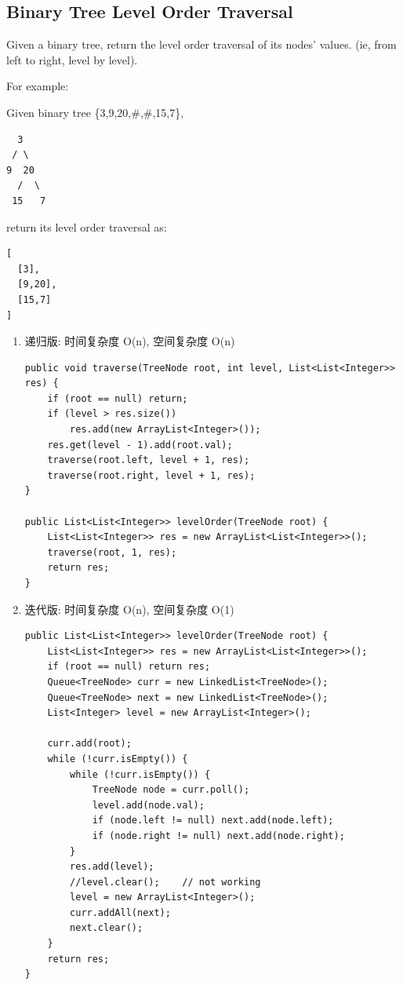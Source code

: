 \documentclass[12pt]{book}
\begin{document}
\subsection{Binary Tree Level Order Traversal}
\label{sec-4-2-4}
Given a binary tree, return the level order traversal of its nodes' values. (ie, from left to right, level by level).

For example:

Given binary tree \{3,9,20,\#,\#,15,7\},
\lstset{language=java,label= ,caption= ,numbers=none}
\begin{lstlisting}
  3
 / \
9  20
  /  \
 15   7
\end{lstlisting}
return its level order traversal as:
\lstset{language=java,label= ,caption= ,numbers=none}
\begin{lstlisting}
[
  [3],
  [9,20],
  [15,7]
]
\end{lstlisting}

\begin{enumerate}
\item 递归版: 时间复杂度 O(n), 空间复杂度 O(n)
\label{sec-4-2-4-1}

\lstset{language=java,label= ,caption= ,numbers=none}
\begin{lstlisting}
public void traverse(TreeNode root, int level, List<List<Integer>> res) {
    if (root == null) return;
    if (level > res.size())
        res.add(new ArrayList<Integer>());
    res.get(level - 1).add(root.val);
    traverse(root.left, level + 1, res);
    traverse(root.right, level + 1, res);
}

public List<List<Integer>> levelOrder(TreeNode root) {
    List<List<Integer>> res = new ArrayList<List<Integer>>();
    traverse(root, 1, res);
    return res;
}
\end{lstlisting}

\item 迭代版: 时间复杂度 O(n), 空间复杂度 O(1)
\label{sec-4-2-4-2}

\lstset{language=java,label= ,caption= ,numbers=none}
\begin{lstlisting}
public List<List<Integer>> levelOrder(TreeNode root) {
    List<List<Integer>> res = new ArrayList<List<Integer>>();
    if (root == null) return res;
    Queue<TreeNode> curr = new LinkedList<TreeNode>();
    Queue<TreeNode> next = new LinkedList<TreeNode>();
    List<Integer> level = new ArrayList<Integer>();

    curr.add(root);
    while (!curr.isEmpty()) {
        while (!curr.isEmpty()) {
            TreeNode node = curr.poll();
            level.add(node.val);
            if (node.left != null) next.add(node.left);
            if (node.right != null) next.add(node.right);
        }
        res.add(level);
        //level.clear();    // not working
        level = new ArrayList<Integer>();
        curr.addAll(next);
        next.clear();
    }
    return res;
}
\end{lstlisting}
\end{enumerate}
\end{document}
